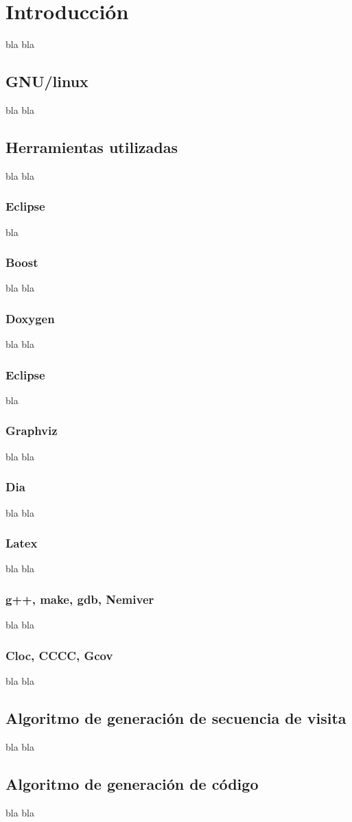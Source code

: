\chapter{Introducci\'on}
\label{chap:implem}
\minitoc


bla bla

\section{GNU/linux}

bla bla

\section{Herramientas utilizadas}
bla bla
\subsection{Eclipse}
bla 
\subsection{Boost}
bla bla
\subsection{Doxygen}
bla bla
\subsection{Eclipse}
bla 
\subsection{Graphviz}
bla bla
\subsection{Dia}
bla bla

\subsection{Latex}
bla bla
\subsection{g++, make, gdb, Nemiver}
bla bla
\subsection{Cloc, CCCC, Gcov}
bla bla
\section{Algoritmo de generaci\'on de secuencia de visita}

bla bla
\section{Algoritmo de generaci\'on de c\'odigo}
bla bla
